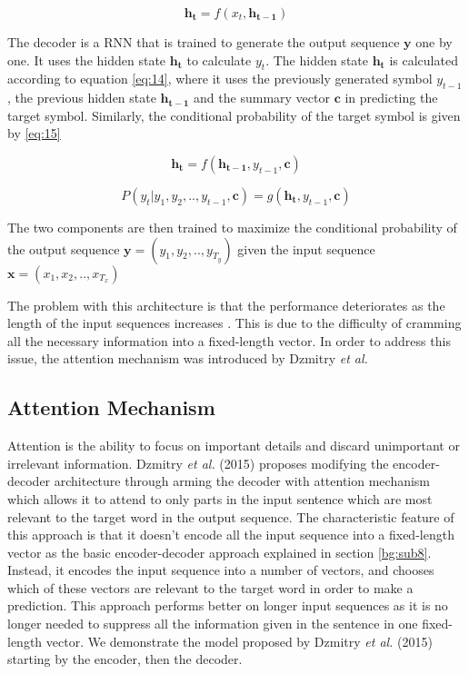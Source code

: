 \begin{equation}
\label{eq:13}
\mathbf{h_t} = f( x_t, \mathbf{h_{t-1}})
\end{equation}


The decoder is a \ac{RNN} that is trained to generate the output sequence $ \mathbf{y}$ one by one. It uses the hidden state $ \mathbf{h_t}$ to calculate $ y_t$. The hidden state $ \mathbf{h_t}$ is calculated according to equation \ref{eq:14}, where it uses the previously generated symbol $y_{t-1}$, the previous hidden state $\mathbf{h_{t-1}}$ and the summary vector $\mathbf{c}$ in predicting the target symbol. Similarly, the conditional probability of the target symbol is given by \ref{eq:15}

\begin{equation}
\label{eq:14}
\mathbf{h_t} = f(\mathbf{h_{t-1}}, y_{t-1}, \mathbf{c})
\end{equation}

\begin{equation}
\label{eq:15}
P(y_t | y_1, y_2,.., y_{t-1}, \mathbf{c}) = g(\mathbf{h_{t}}, y_{t-1}, \mathbf{c})
\end{equation}

The two components are then trained to maximize the conditional probability of the output sequence $\mathbf{y}=(y_1,y_2,..,y_{T_y})$ given the input sequence $ \mathbf{x}=(x_1,x_2,..,x_{T_x})$


The problem with this architecture is that the performance deteriorates as the length of the input sequences increases \cite{cho2014properties}. This is due to the difficulty of cramming all the necessary information into a fixed-length vector. In order to address this issue, the attention mechanism was introduced by Dzmitry \textit{et al.} \cite{bahdanau2014neural}


\subsection{Attention Mechanism} 
\label{bg:sub9}

Attention is the ability to focus on important details and discard unimportant or irrelevant information. Dzmitry \textit{et al.} (2015) \cite{bahdanau2014neural} proposes modifying the encoder-decoder architecture through arming the decoder with attention mechanism which allows it to attend to only parts in the input sentence which are most relevant to the target word in the output sequence. The characteristic feature of this approach is that it doesn't encode all the input sequence into a fixed-length vector as the basic encoder-decoder approach explained in section \ref{bg:sub8}. Instead, it encodes the input sequence into a number of vectors, and chooses which of these vectors are relevant to the target word in order to make a prediction. This approach performs better on longer input sequences as it is no longer needed to suppress all the information given in the sentence in one fixed-length vector. We demonstrate the model proposed by  Dzmitry \textit{et al.} (2015) \cite{bahdanau2014neural} starting by the encoder, then the decoder.

